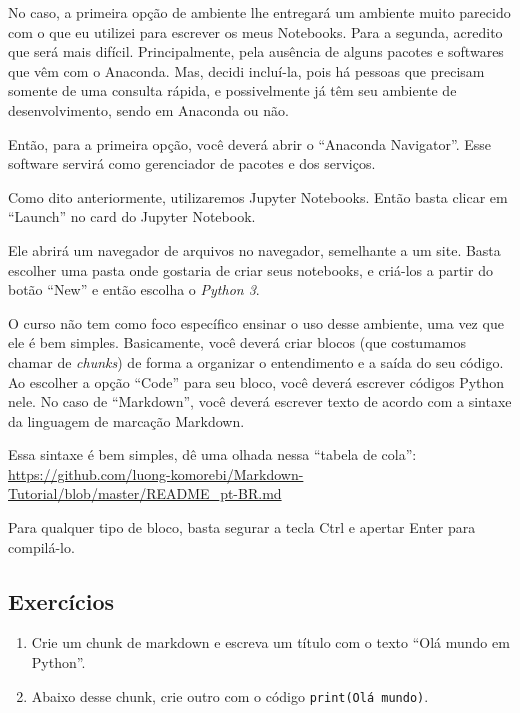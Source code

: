 \documentclass[11pt, brazilian]{article}
\providecommand{\tightlist}{%
      \setlength{\itemsep}{0pt}\setlength{\parskip}{0pt}}
\begin{document}
No caso, a primeira opção de ambiente lhe entregará um ambiente muito
parecido com o que eu utilizei para escrever os meus Notebooks. Para a
segunda, acredito que será mais difícil. Principalmente, pela ausência
de alguns pacotes e softwares que vêm com o Anaconda. Mas, decidi
incluí-la, pois há pessoas que precisam somente de uma consulta rápida,
e possivelmente já têm seu ambiente de desenvolvimento, sendo em
Anaconda ou não.

Então, para a primeira opção, você deverá abrir o ``Anaconda
Navigator''. Esse software servirá como gerenciador de pacotes e dos
serviços.

Como dito anteriormente, utilizaremos Jupyter Notebooks. Então basta
clicar em ``Launch'' no card do Jupyter Notebook.

Ele abrirá um navegador de arquivos no navegador, semelhante a um site.
Basta escolher uma pasta onde gostaria de criar seus notebooks, e
criá-los a partir do botão ``New'' e então escolha o \emph{Python 3}.

O curso não tem como foco específico ensinar o uso desse ambiente, uma
vez que ele é bem simples. Basicamente, você deverá criar blocos (que
costumamos chamar de \emph{chunks}) de forma a organizar o entendimento
e a saída do seu código. Ao escolher a opção ``Code'' para seu bloco,
você deverá escrever códigos Python nele. No caso de ``Markdown'', você
deverá escrever texto de acordo com a sintaxe da linguagem de marcação
Markdown.

Essa sintaxe é bem simples, dê uma olhada nessa ``tabela de cola'':
\url{https://github.com/luong-komorebi/Markdown-Tutorial/blob/master/README_pt-BR.md}

Para qualquer tipo de bloco, basta segurar a tecla Ctrl e apertar Enter
para compilá-lo.

    \hypertarget{exercuxedcios}{%
\subsection{Exercícios}\label{exercuxedcios}}

\begin{enumerate}
\def\labelenumi{\arabic{enumi}.}
\tightlist
\item
  Crie um chunk de markdown e escreva um título com o texto ``Olá mundo
  em Python''.
\item
  Abaixo desse chunk, crie outro com o código
  \texttt{print(\textquotesingle{}Olá\ mundo\textquotesingle{})}.
\end{enumerate}
\end{document}
